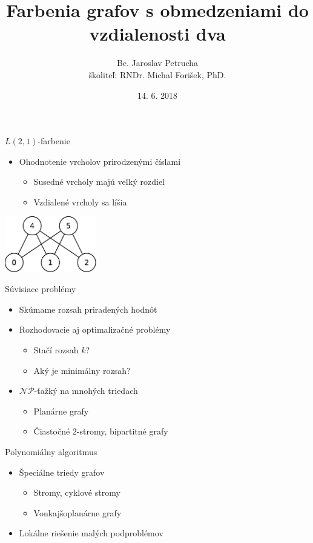 \documentclass[slovak]{beamer}
\title[$L(2,1)$-farbenia grafov]{Farbenia grafov s obmedzeniami do vzdialenosti dva}
\author[Bc. Jaroslav Petrucha]{Bc. Jaroslav Petrucha \\ školiteľ: RNDr. Michal Forišek, PhD.}
\date{14. 6. 2018}
\begin{document}
\begin{frame}
\titlepage
\end{frame}

\begin{frame}{$L(2,1)$-farbenie}
    \begin{itemize}
        \item Ohodnotenie vrcholov prirodzenými číslami
        \begin{itemize}
            \item Susedné vrcholy majú veľký rozdiel
            \item Vzdialené vrcholy sa líšia
        \end{itemize}
    \end{itemize}
    \begin{center}
        \includegraphics[width=0.3\textwidth]{grafy/l21-example.pdf}
    \end{center}
\end{frame}

\begin{frame}{Súvisiace problémy}
    \begin{itemize}
        \item Skúmame rozsah priradených hodnôt
        \item Rozhodovacie aj optimalizačné problémy
        \begin{itemize}
            \item Stačí rozsah $k$?
            \item Aký je minimálny rozsah?
        \end{itemize}
        \item{$\mathcal{NP}$-ťažký na mnohých triedach}
        \begin{itemize}
            \item Planárne grafy
            \item Čiastočné $2$-stromy, bipartitné grafy
        \end{itemize}
    \end{itemize}
\end{frame}

\begin{frame}{Polynomiálny algoritmus}
    \begin{itemize}
        \item Špeciálne triedy grafov
        \begin{itemize}
            \item Stromy, cyklové stromy
            \item Vonkajšoplanárne grafy
        \end{itemize}
        \item Lokálne riešenie malých podproblémov
    \end{itemize}
\end{frame}
\end{document}
